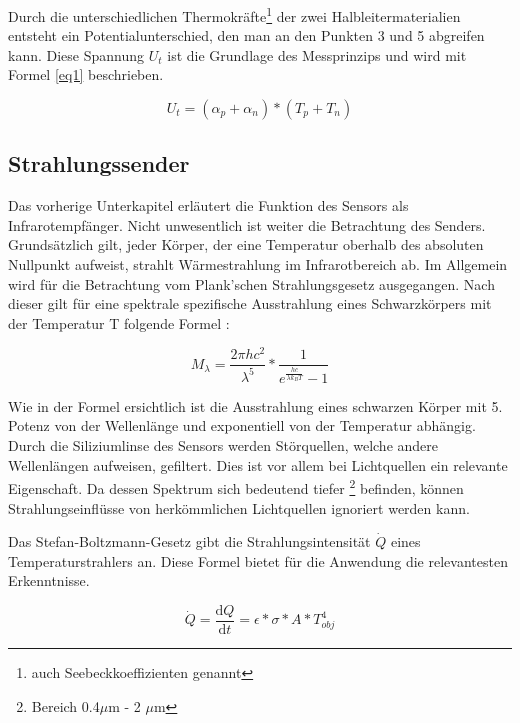 Durch die unterschiedlichen Thermokräfte\footnote[2]{auch Seebeckkoeffizienten genannt} der zwei Halbleitermaterialien entsteht ein Potentialunterschied, den man an den Punkten 3 und 5 abgreifen kann. Diese Spannung $U_{t}$ ist die Grundlage des Messprinzips und wird mit Formel \ref{eq1} \protect\cite{AMG8834} beschrieben.

\begin{equation}
\label{eq1}
U_{t} = (\alpha_{p} + \alpha_{n})*(T_{p}+T_{n})
\end{equation}

\subsection{Strahlungssender}
\label{subsec:Strahlungstheorie}
Das vorherige Unterkapitel erläutert die Funktion des Sensors als Infrarotempfänger. Nicht unwesentlich ist weiter die Betrachtung des Senders. Grundsätzlich gilt, jeder Körper, der eine Temperatur oberhalb des absoluten Nullpunkt aufweist, strahlt Wärmestrahlung im Infrarotbereich ab. Im Allgemein wird für die Betrachtung vom Plank'schen Strahlungsgesetz ausgegangen. Nach dieser gilt für eine spektrale spezifische Ausstrahlung eines Schwarzkörpers mit der Temperatur T folgende Formel \protect\cite{Thermoformeln}:

\begin{equation}
\label{eq2}
M_{\lambda } = \frac{2\pi h c^2 }{\lambda^5}*\frac{1}{e^\frac{hc}{\lambda k_{B} T}-1}
\end{equation}

Wie in der Formel ersichtlich ist die Ausstrahlung eines schwarzen Körper mit 5. Potenz von der Wellenlänge und exponentiell von der Temperatur abhängig. Durch die Siliziumlinse des Sensors werden Störquellen, welche andere Wellenlängen aufweisen, gefiltert. Dies ist vor allem bei Lichtquellen ein relevante Eigenschaft. Da dessen Spektrum sich bedeutend tiefer \footnote[3]{Bereich 0.4$\mu$m - 2 $\mu$m} befinden, können Strahlungseinflüsse von herkömmlichen Lichtquellen ignoriert werden kann.

Das Stefan-Boltzmann-Gesetz \protect\cite{Thermoformeln} gibt die Strahlungsintensität $\dot{Q}$ eines Temperaturstrahlers an. Diese Formel bietet für die Anwendung die relevantesten Erkenntnisse.

\begin{equation}
\label{eq3}
\dot{Q} = \frac{\mathrm{d} Q}{\mathrm{d} t} = \epsilon *\sigma * A * T_{obj}^4
\end{equation}

